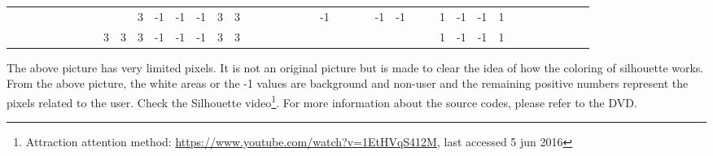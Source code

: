 \begin{table}[H]
{\begin{tabular}{ccccccccccccccccccccccccccccccccccccccccc}
   &    &                           &                           &                           &                           &                           &                           &                           &                           & \cellcolor[HTML]{3531FF}3 & -1                        & -1                        & -1                        & \cellcolor[HTML]{3531FF}3 & \cellcolor[HTML]{3531FF}3 &                           &                           &                           &                           &                           &                           & -1                        &    &    &    & -1                        & -1                        &                           &                           & \cellcolor[HTML]{329A9D}1 & -1                        & -1                        & \cellcolor[HTML]{329A9D}1 &                           &                           &                           &                           &  &  &  \\
   &    &                           &                           &                           &                           &                           &                           & \cellcolor[HTML]{3531FF}3 & \cellcolor[HTML]{3531FF}3 & \cellcolor[HTML]{3531FF}3 & -1                        & -1                        & -1                        & \cellcolor[HTML]{3531FF}3 & \cellcolor[HTML]{3531FF}3 &                           &                           &                           &                           &                           &                           &                           &    &    &    &                           &                           &                           &                           & \cellcolor[HTML]{329A9D}1 & -1                        & -1                        & \cellcolor[HTML]{329A9D}1 &                           &                           &                           &                           &  &  & 
\end{tabular}
}
\end{table}

The above picture has very limited pixels. It is not an original picture but is made to clear the idea of how the coloring of silhouette works. From the above picture, the white areas or the -1 values are background and non-user and the remaining positive numbers represent the pixels related to the user.
Check the Silhouette video\footnote{Attraction attention method: \url{https://www.youtube.com/watch?v=1EtHVqS412M}, last accessed 5 jun 2016}. For more information about the source codes, please refer to the DVD.


